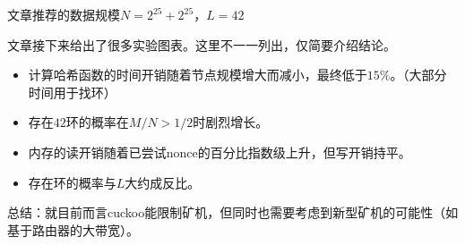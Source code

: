 文章推荐的数据规模$N=2^{25}+2^{25}$，$L=42$

文章接下来给出了很多实验图表。这里不一一列出，仅简要介绍结论。
\begin{itemize}
	\item 计算哈希函数的时间开销随着节点规模增大而减小，最终低于$15\%$。（大部分时间用于找环）
	\item 存在$42$环的概率在$M/N>1/2$时剧烈增长。
	\item 内存的读开销随着已尝试nonce的百分比指数级上升，但写开销持平。
	\item 存在环的概率与$L$大约成反比。
\end{itemize}

总结：就目前而言cuckoo能限制矿机，但同时也需要考虑到新型矿机的可能性（如基于路由器的大带宽）。